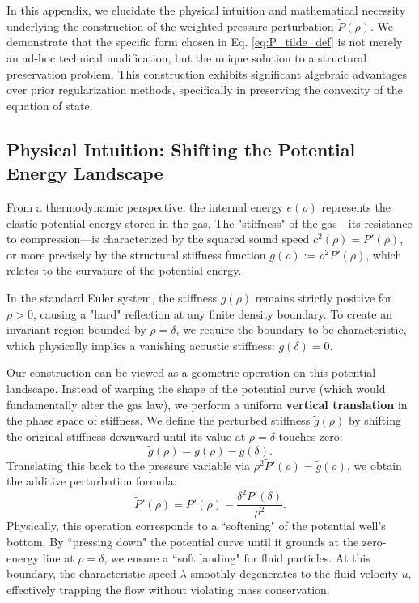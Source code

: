 \documentclass[12pt, reqno]{article}
\theoremstyle{definition}
\numberwithin{equation}{section}
\begin{document}
In this appendix, we elucidate the physical intuition and mathematical necessity underlying the construction of the weighted pressure perturbation $\tilde{P}(\rho)$. We demonstrate that the specific form chosen in Eq. \eqref{eq:P_tilde_def} is not merely an ad-hoc technical modification, but the unique solution to a structural preservation problem. This construction exhibits significant algebraic advantages over prior regularization methods, specifically in preserving the convexity of the equation of state.

\subsection{Physical Intuition: Shifting the Potential Energy Landscape}

From a thermodynamic perspective, the internal energy $e(\rho)$ represents the elastic potential energy stored in the gas. The "stiffness" of the gas—its resistance to compression—is characterized by the squared sound speed $c^2(\rho) = P'(\rho)$, or more precisely by the structural stiffness function $g(\rho) := \rho^2 P'(\rho)$, which relates to the curvature of the potential energy.

In the standard Euler system, the stiffness $g(\rho)$ remains strictly positive for $\rho > 0$, causing a "hard" reflection at any finite density boundary. To create an invariant region bounded by $\rho=\delta$, we require the boundary to be characteristic, which physically implies a vanishing acoustic stiffness: $g(\delta) = 0$.

Our construction can be viewed as a geometric operation on this potential landscape. Instead of warping the shape of the potential curve (which would fundamentally alter the gas law), we perform a uniform \textbf{vertical translation} in the phase space of stiffness.
We define the perturbed stiffness $\tilde{g}(\rho)$ by shifting the original stiffness downward until its value at $\rho=\delta$ touches zero:
\begin{equation}
    \tilde{g}(\rho) = g(\rho) - g(\delta).
\end{equation}
Translating this back to the pressure variable via $\rho^2 \tilde{P}'(\rho) = \tilde{g}(\rho)$, we obtain the additive perturbation formula:
\begin{equation}
    \tilde{P}'(\rho) = P'(\rho) - \frac{\delta^2 P'(\delta)}{\rho^2}.
\end{equation}
Physically, this operation corresponds to a ``softening" of the potential well's bottom. By ``pressing down" the potential curve until it grounds at the zero-energy line at $\rho=\delta$, we ensure a ``soft landing" for fluid particles. At this boundary, the characteristic speed $\lambda$ smoothly degenerates to the fluid velocity $u$, effectively trapping the flow without violating mass conservation.
\end{document}
